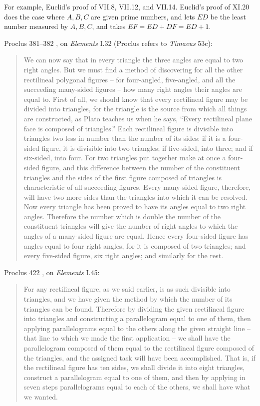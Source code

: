 \documentclass{article}
\begin{document}
For example, 
Euclid's proof of VII.8, VII.12, and VII.14. 
Euclid's proof of  XI.20 does the case where $A,B,C$ are given prime numbers, and lets
$ED$ be the least number measured by $A,B,C$, and takes $EF=ED+DF=ED+1$. 

Proclus 381--382 \cite[pp.~300--301]{proclus}, on {\em Elements} I.32 (Proclus refers to {\em Timaeus} 53c):

\begin{quote}
We can now say that in 
every triangle the three angles are equal to two right angles. 
But we must find a method of discovering for all the other
rectilineal polygonal figures -- for four-angled, five-angled,
and all the succeeding many-sided figures -- how many right
angles their angles are equal to. First of all, we should know
that every rectilineal figure may be divided into triangles, for
the triangle is the source from which all things are constructed,
as Plato teaches us when he says, ``Every rectilineal plane
face is composed of triangles.'' Each rectilineal figure is
divisible into triangles two less in number than the number of
its sides: if it is a four-sided figure, it is divisible into two
triangles; if five-sided, into three; and if six-sided, into four.
For two triangles put together make at once a four-sided
figure, and this difference between the number of the
constituent triangles and the sides of the first figure
composed of triangles is characteristic of all succeeding figures.
Every many-sided figure, therefore, will have two more
sides than the triangles into which it can be resolved. Now
every triangle has been proved to have its angles equal to
two right angles. Therefore the number which is double the
number of the constituent triangles will give the number of
right angles to which the angles of a many-sided figure are
equal. Hence every four-sided figure has angles equal to four
right angles, for it is composed of two triangles; and every
five-sided figure, six right angles; and similarly for the rest.
\end{quote}

Proclus 422 \cite[pp.~334--335]{proclus}, on {\em Elements} I.45:

\begin{quote}
For any 
rectilineal figure, as we said earlier, is as such divisible into
triangles, and we have given the method by which the number
of its triangles can be found. Therefore by dividing the
given rectilineal figure into triangles and constructing a
parallelogram equal to one of them, then applying parallelograms
equal to the others along the given straight line -- that
line to which we made the first application -- we shall have the
parallelogram composed of them equal to the rectilineal figure
composed of the triangles, and the assigned task will have been
accomplished. That is, if the rectilineal figure has ten sides,
we shall divide it into eight triangles, construct a parallelogram
equal to one of them, and then by applying in seven
steps parallelograms equal to each of the others, we shall
have what we wanted.
\end{quote}
\end{document}
